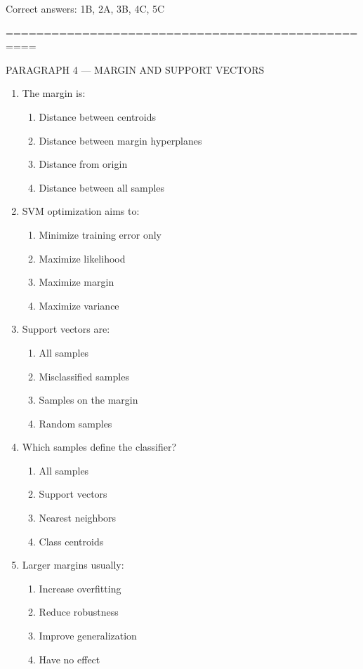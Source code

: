 \documentclass{article}
\begin{document}
	Correct answers: 1B, 2A, 3B, 4C, 5C
	
	\bigskip
	==================================================
	
	PARAGRAPH 4 — MARGIN AND SUPPORT VECTORS
	
	\begin{enumerate}
		\item The margin is:
		\begin{enumerate}
			\item Distance between centroids
			\item Distance between margin hyperplanes
			\item Distance from origin
			\item Distance between all samples
		\end{enumerate}
		
		\item SVM optimization aims to:
		\begin{enumerate}
			\item Minimize training error only
			\item Maximize likelihood
			\item Maximize margin
			\item Maximize variance
		\end{enumerate}
		
		\item Support vectors are:
		\begin{enumerate}
			\item All samples
			\item Misclassified samples
			\item Samples on the margin
			\item Random samples
		\end{enumerate}
		
		\item Which samples define the classifier?
		\begin{enumerate}
			\item All samples
			\item Support vectors
			\item Nearest neighbors
			\item Class centroids
		\end{enumerate}
		
		\item Larger margins usually:
		\begin{enumerate}
			\item Increase overfitting
			\item Reduce robustness
			\item Improve generalization
			\item Have no effect
		\end{enumerate}
	\end{enumerate}
	
\end{document}
